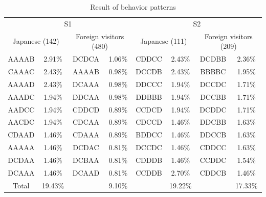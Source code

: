 \begin{table}[h]
  \caption{Result of behavior patterns}
  \label{table40}
\centering
\begin{tabular}{cc|cc|cc|cc}
\hline
\multicolumn{4}{c|}{S1}                                                     & \multicolumn{4}{c}{S2}                                                     \\
\multicolumn{2}{c}{Japanese (142)}  & \multicolumn{2}{c|}{Foreign visitors (480)} & \multicolumn{2}{c}{Japanese (111)}  & \multicolumn{2}{c}{Foreign visitors (209)} \\
\hline
AAAAB & 2.91\%                      & DCDCA  & 1.06\%                      & CDDCC & 2.43\%                      & DCDBB  & 2.36\%                      \\
CAAAC & 2.43\%                      & AAAAB  & 0.98\%                      & DCCDB & 2.43\%                      & BBBBC  & 1.95\%                      \\
AAAAD & 2.43\%                      & DCAAA  & 0.98\%                      & DDCCC & 1.94\%                      & DCCDC  & 1.71\%                      \\
AAADC & 1.94\%                      & DDCAA  & 0.98\%                      & DDBBB & 1.94\%                      & DCCBB  & 1.71\%                      \\
AADCC & 1.94\%                      & CDDCD  & 0.89\%                      & CCDCD & 1.94\%                      & DCDDC  & 1.71\%                      \\
AACDC & 1.94\%                      & CDCAA  & 0.89\%                      & CDCCD & 1.46\%                      & DDCBB  & 1.63\%                      \\
CDAAD & 1.46\%                      & CDAAA  & 0.89\%                      & BDDCC & 1.46\%                      & DDCCB  & 1.63\%                      \\
AAAAA & 1.46\%                      & DCDAC  & 0.81\%                      & DCCDC & 1.46\%                      & CDDCC  & 1.63\%                      \\
DCDAA & 1.46\%                      & DCBAA  & 0.81\%                      & CDDDB & 1.46\%                      & CCDDC  & 1.54\%                      \\
DCAAA & 1.46\%                      & DCAAD  & 0.81\%                      & CCDDB & \multicolumn{1}{c}{2.70\%}  & CDDCB  & 1.46\%                      \\
\hline
Total & \multicolumn{1}{c}{19.43\%} &        & \multicolumn{1}{c|}{9.10\%}  &       & \multicolumn{1}{c}{19.22\%} &        & \multicolumn{1}{c}{17.33\%} \\

\end{tabular}
\end{table}
